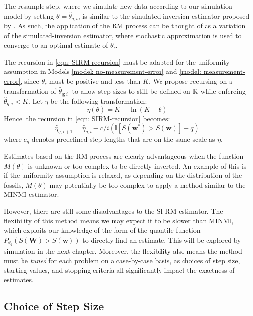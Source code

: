 The resample step, where we simulate new data according to our simulation model by setting $\theta = \hat\theta_{q; i}$, is similar to the simulated inversion estimator proposed by \citet{Huang2019}. As such, the application of the RM process can be thought of as a variation of the simulated-inversion estimator, where stochastic approximation is used to converge to an optimal estimate of $\theta_q$.

The recursion in \autoref{eqn: SIRM-recursion} must be adapted for the uniformity assumption in Models \ref{model: no-measurement-error} and \ref{model: measurement-error}, since $\theta_q$ must be positive and less than $K$. We propose recursing on a transformation of $\hat\theta_{q; i}$, to allow step sizes to still be defined on $\mathbb{R}$ while enforcing $\hat\theta_{q;i} < K$. Let $\eta$ be the following transformation:\begin{equation}
    \eta(\theta) = K -\ln(K-\theta)
\end{equation}
Hence, the recursion in \autoref{eqn: SIRM-recursion} becomes:
\begin{equation}
    \hat\eta_{q; i+1} = \hat\eta_{q; i} - c/i \left( \mathbb{I}\left[S(\bm{w^*}) > S(\bm{w})\right] - q \right)
\end{equation}
where $c_\eta$ denotes predefined step lengths that are on the same scale as $\eta$.

Estimates based on the RM process are clearly advantageous when the function $M(\theta)$ is unknown or too complex to be directly inverted. An example of this is if the uniformity assumption is relaxed, as depending on the distribution of the fossils, $M(\theta)$ may potentially be too complex to apply a method similar to the MINMI estimator. 

However, there are still some disadvantages to the SI-RM estimator. The flexibility of this method means we may expect it to be slower than MINMI, which exploits our knowledge of the form of the quantile function $P_{\theta_q}(S(\bm{W})>S(\bm{w}))$ to directly find an estimate. This will be explored by simulation in the next chapter. Moreover, the flexibility also means the method must be \textit{tuned} for each problem on a case-by-case basis, as choices of step size, starting values, and stopping criteria all significantly impact the exactness of estimates.

\subsection{Choice of Step Size}

